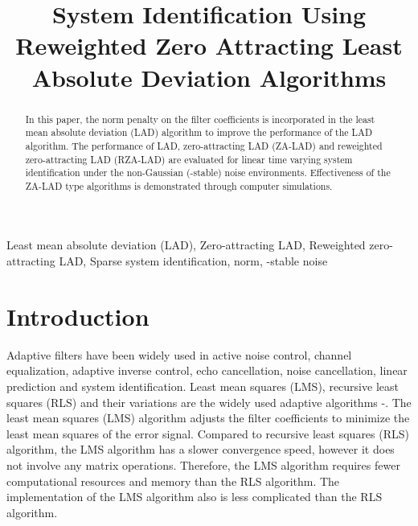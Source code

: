 \documentclass[conference]{IEEEtran}
\begin{document}
\title{System Identification Using Reweighted Zero Attracting Least Absolute Deviation Algorithms}


\author{
}










\maketitle


\begin{abstract}
In this paper,  the  norm penalty on the filter coefficients is incorporated in the least mean absolute deviation (LAD) algorithm to improve the performance of the LAD algorithm.  The performance of LAD, zero-attracting LAD (ZA-LAD)  and reweighted  zero-attracting LAD (RZA-LAD) are evaluated for linear time varying system identification under the non-Gaussian (-stable)  noise environments. Effectiveness of the ZA-LAD type algorithms is demonstrated through computer simulations.
\end{abstract}

\begin{IEEEkeywords}
Least mean absolute deviation (LAD), Zero-attracting LAD, Reweighted  zero-attracting LAD, Sparse system identification,  norm, -stable noise
\end{IEEEkeywords}


\section{Introduction}
\label{S1}
Adaptive  filters have been widely used in active noise control, channel equalization, adaptive inverse control, echo cancellation, noise cancellation, linear prediction and system identification.  Least mean squares (LMS), recursive least squares (RLS) and their variations are the widely used  adaptive algorithms \cite{ref1b}-\cite{ref4b}. The least mean squares (LMS) algorithm adjusts the filter coefficients to minimize the least mean squares of the error signal. Compared to recursive least squares (RLS) algorithm, the LMS algorithm has a slower convergence speed, however it does not involve any matrix operations. Therefore, the LMS algorithm requires fewer computational resources and memory than the RLS algorithm. The implementation of the LMS algorithm also is less complicated than the RLS algorithm. 
\end{document}
